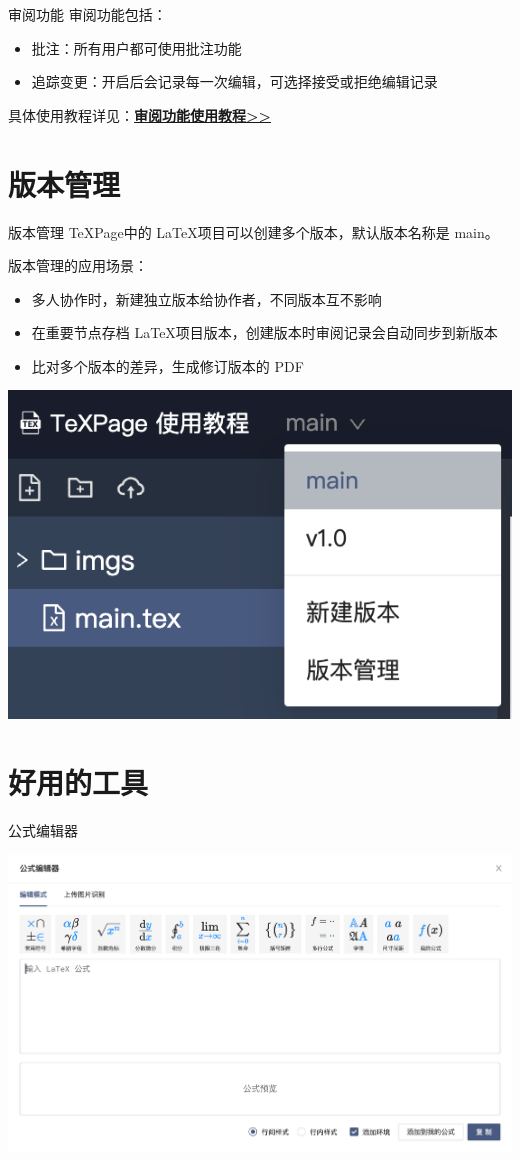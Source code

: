 \documentclass{beamer}
\DeclareRobustCommand\texpage{\TeX Page}
\newenvironment{display}{\trivlist\item[]}{\endtrivlist}
\begin{document}
\begin{frame}{审阅功能}
审阅功能包括：
\begin{itemize}
\item 批注：所有用户都可使用批注功能
\item 追踪变更：开启后会记录每一次编辑，可选择接受或拒绝编辑记录
\end{itemize}
具体使用教程详见：\href{https://www.texpage.com/docs/features/texpage-review/}{\textbf{审阅功能使用教程{}>>}}
\end{frame}

\section{版本管理}
\begin{frame}{版本管理}
\texpage 中的 \LaTeX 项目可以创建多个版本，默认版本名称是 main。

版本管理的应用场景：
\begin{itemize}
    \item 多人协作时，新建独立版本给协作者，不同版本互不影响
    \item 在重要节点存档 \LaTeX 项目版本，创建版本时审阅记录会自动同步到新版本
    \item 比对多个版本的差异，生成修订版本的 PDF
\end{itemize}

\begin{display}
    \centering
    \includegraphics[width=.35\textwidth]{imgs/version-entry.png}
\end{display}
\end{frame}

\section{好用的工具}

\begin{frame}{公式编辑器}
\begin{center}
    \includegraphics[width=\textwidth]{imgs/math.png}
\end{center}
\end{frame}
\end{document}
